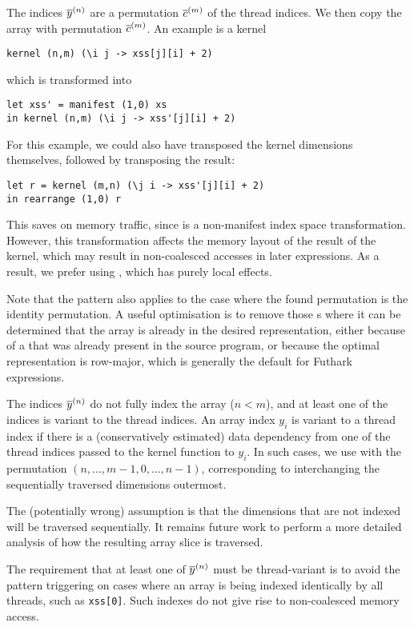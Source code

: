 \begin{description}[style=nextline]
\item[Complete Index]

  The indices $\overline{y}^{(n)}$ are a permutation $\overline{c}^{(m)}$ of the
  thread indices.  We then copy the array with permutation
  $\overline{c}^{(m)}$.  An example is a kernel
\begin{lstlisting}[numbers=none]
kernel (n,m) (\i j -> xss[j][i] + 2)
\end{lstlisting}
which is transformed into
\begin{lstlisting}[numbers=none]
let xss' = manifest (1,0) xs
in kernel (n,m) (\i j -> xss'[j][i] + 2)
\end{lstlisting}

For this example, we could also have transposed the kernel dimensions
themselves, followed by transposing the result:
\begin{lstlisting}[numbers=none]
let r = kernel (m,n) (\j i -> xss'[j][i] + 2)
in rearrange (1,0) r
\end{lstlisting}
This saves on memory traffic, since  is a non-manifest
index space transformation.  However, this transformation affects the
memory layout of the result of the kernel, which may result in
non-coalesced accesses in later expressions.  As a result, we prefer
using , which has purely local effects.

Note that the pattern also applies to the case where the found
permutation is the identity permutation.  A useful optimisation is to
remove those s where it can be determined that the array
is already in the desired representation, either because of a
 that was already present in the source program, or
because the optimal representation is row-major, which is generally
the default for Futhark expressions.

\item[Incomplete Index]

  The indices $\overline{y}^{(n)}$ do not fully index the array ($n<m$), and
  at least one of the indices is variant to the thread indices.  An
  array index $y_{i}$ is variant to a thread index if there is a
  (conservatively estimated) data dependency from one of the thread
  indices passed to the kernel function to $y_{i}$.  In such cases, we
  use  with the permutation
  $(n,\ldots,m-1,0,\ldots,n-1)$, corresponding to interchanging the
  sequentially traversed dimensions outermost.

  The (potentially wrong) assumption is that the dimensions that are
  not indexed will be traversed sequentially.  It remains future work
  to perform a more detailed analysis of how the resulting array slice
  is traversed.

  The requirement that at least one of $\overline{y}^{(n)}$ must be
  thread-variant is to avoid the pattern triggering on cases where an
  array is being indexed identically by all threads, such as
  \lstinline{xss[0]}.  Such indexes do not give rise to non-coalesced
  memory access.
\end{description}

